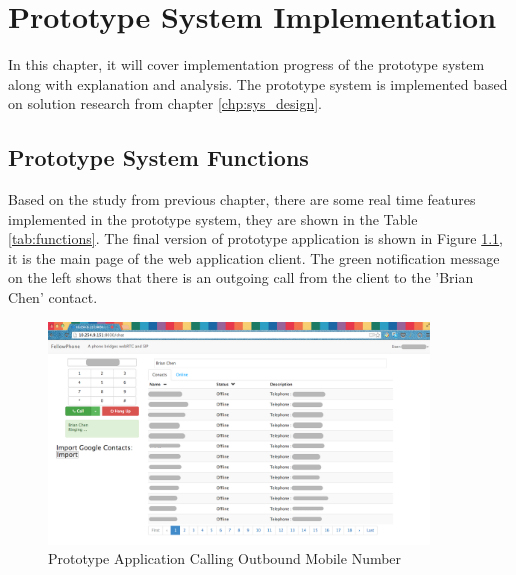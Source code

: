 \chapter{Prototype System Implementation}
\label{chp:sys_imp}

\noindent In this chapter, it will cover implementation progress of the prototype system along with explanation and analysis. The prototype system is implemented based on solution research from chapter \ref{chp:sys_design}.

\section{Prototype System Functions}

\noindent Based on the study from previous chapter, there are some real time features implemented in the prototype system, they are shown in the Table \ref{tab:functions}. The final version of prototype application is shown in Figure \ref{fig:webgui_call_outgoing}, it is the main page of the web application client. The green notification message on the left shows that there is an outgoing call from the client to the 'Brian Chen' contact.

\begin{figure}
	\centering
    	\includegraphics[width=0.90\textwidth,natwidth=610,natheight=642]{figs/webgui_call_outgoing.png}
  	\caption{Prototype Application Calling Outbound Mobile Number}
  	\label{fig:webgui_call_outgoing}
\end{figure}

